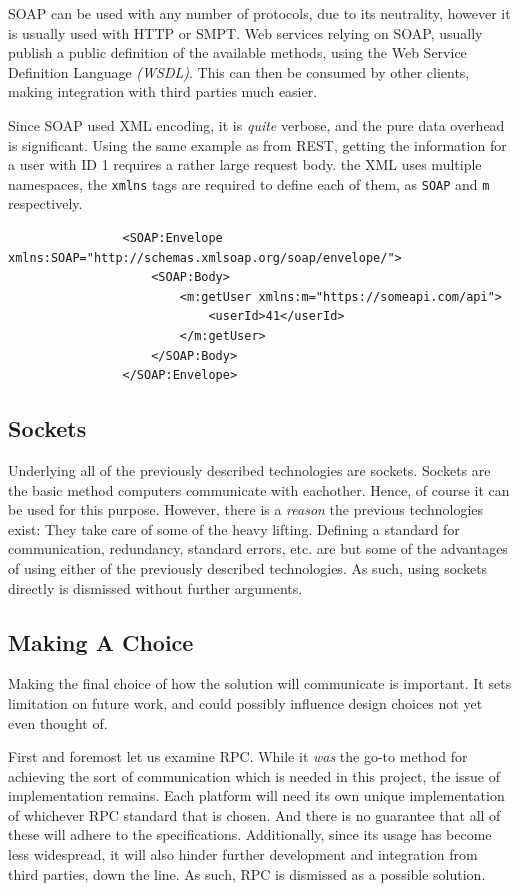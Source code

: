 			SOAP can be used with any number of protocols, due to its neutrality, however it is usually used with HTTP or SMPT. Web services relying on SOAP, usually publish a public definition of the available methods, using the Web Service Definition Language \emph{(WSDL)}. This can then be consumed by other clients, making integration with third parties much easier.

			Since SOAP used XML encoding, it is \emph{quite} verbose, and the pure data overhead is significant. Using the same example as from REST, getting the information for a user with ID 1 requires a rather large request body. the XML uses multiple namespaces, the \verb=xmlns= tags are required to define each of them, as \verb=SOAP= and \verb=m= respectively.

			\begin{verbatim}
				<SOAP:Envelope xmlns:SOAP="http://schemas.xmlsoap.org/soap/envelope/">
				    <SOAP:Body>
				        <m:getUser xmlns:m="https://someapi.com/api">
				            <userId>41</userId>
				        </m:getUser>
				    </SOAP:Body>
				</SOAP:Envelope>
			\end{verbatim}


		\subsection{Sockets}
			Underlying all of the previously described technologies are sockets. Sockets are the basic method computers communicate with eachother. Hence, of course it can be used for this purpose. However, there is a \emph{reason} the previous technologies exist: They take care of some of the heavy lifting. Defining a standard for communication, redundancy, standard errors, etc. are but some of the advantages of using either of the previously described technologies. As such, using sockets directly is dismissed without further arguments. 


		\subsection{Making A Choice}
			Making the final choice of how the solution will communicate is important. It sets limitation on future work, and could possibly influence design choices not yet even thought of. 

			First and foremost let us examine RPC. While it \emph{was} the go-to method for achieving the sort of communication which is needed in this project, the issue of implementation remains. Each platform will need its own unique implementation of whichever RPC standard that is chosen. And there is no guarantee that all of these will adhere to the specifications. Additionally, since its usage has become less widespread, it will also hinder further development and integration from third parties, down the line. As such, RPC is dismissed as a possible solution.

